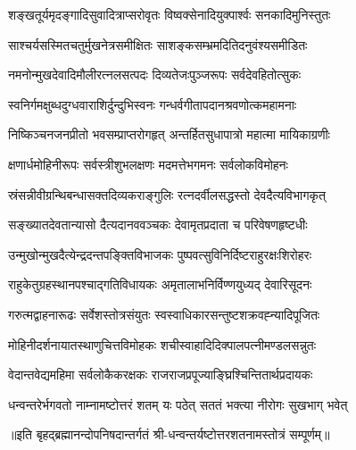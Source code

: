 \twolineshloka
{शङ्खतूर्यमृदङ्गादिसुवादित्राप्सरोवृतः}
{विष्वक्सेनादियुक्पार्श्वः सनकादिमुनिस्तुतः}

\twolineshloka
{साश्चर्यसस्मितचतुर्मुखनेत्रसमीक्षितः}
{साशङ्कसम्भ्रमदितिदनुवंश्यसमीडितः}

\twolineshloka
{नमनोन्मुखदेवादिमौलीरत्नलसत्पदः}
{दिव्यतेजःपुञ्जरूपः सर्वदेवहितोत्सुकः}

\twolineshloka
{स्वनिर्गमक्षुब्धदुग्धवाराशिर्दुन्दुभिस्वनः}
{गन्धर्वगीतापदानश्रवणोत्कमहामनाः}

\twolineshloka
{निष्किञ्चनजनप्रीतो भवसम्प्राप्तरोगहृत्}
{अन्तर्हितसुधापात्रो महात्मा मायिकाग्रणीः}

\twolineshloka
{क्षणार्धमोहिनीरूपः सर्वस्त्रीशुभलक्षणः}
{मदमत्तेभगमनः सर्वलोकविमोहनः}

\twolineshloka
{स्रंसन्नीवीग्रन्थिबन्धासक्तदिव्यकराङ्गुलिः}
{रत्नदर्वीलसद्धस्तो देवदैत्यविभागकृत्}

\twolineshloka
{सङ्ख्यातदेवतान्यासो दैत्यदानववञ्चकः}
{देवामृतप्रदाता च परिवेषणहृष्टधीः}

\twolineshloka
{उन्मुखोन्मुखदैत्येन्द्रदन्तपङ्क्तिविभाजकः}
{पुष्पवत्सुविनिर्दिष्टराहुरक्षःशिरोहरः}

\twolineshloka
{राहुकेतुग्रहस्थानपश्चाद्गतिविधायकः}
{अमृतालाभनिर्विण्णयुध्यद् देवारिसूदनः}

\twolineshloka
{गरुत्मद्वाहनारूढः सर्वेशस्तोत्रसंयुतः}
{स्वस्वाधिकारसन्तुष्टशक्रवह्न्यादिपूजितः}

\twolineshloka
{मोहिनीदर्शनायातस्थाणुचित्तविमोहकः}
{शचीस्वाहादिदिक्पालपत्नीमण्डलसन्नुतः}

\twolineshloka
{वेदान्तवेद्यमहिमा सर्वलोकैकरक्षकः}
{राजराजप्रपूज्याङ्घ्रिश्चिन्तितार्थप्रदायकः}

\twolineshloka
{धन्वन्तरेर्भगवतो नाम्नामष्टोत्तरं शतम्}
{यः पठेत् सततं भक्त्या नीरोगः सुखभाग् भवेत्}

{॥इति बृहद्ब्रह्मानन्दोपनिषदान्तर्गतं श्री-धन्वन्तर्यष्टोत्तरशतनामस्तोत्रं सम्पूर्णम्॥}